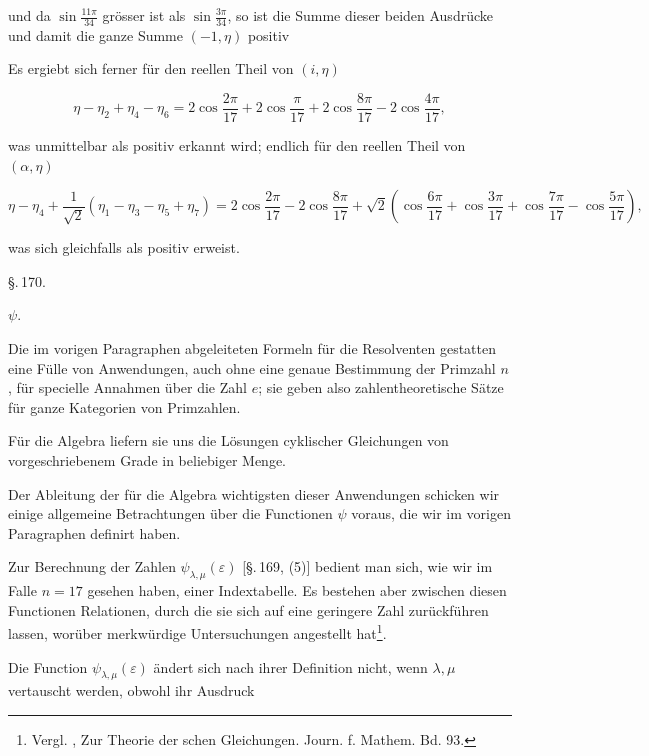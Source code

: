und da $\sin\frac{11\pi}{34}$ grösser ist als $\sin\frac{3\pi}{34}$, so ist die Summe dieser
beiden Ausdrücke und damit die ganze Summe $(-1,\eta)$ positiv %

Es ergiebt sich ferner für den reellen Theil von $(i,\eta)$

\[
\eta - \eta_2 + \eta_4 - \eta_6 = 2\cos\frac{2\pi}{17} + 2\cos\frac{\pi}{17} + 2\cos\frac{8\pi}{17} - 2\cos\frac{4\pi}{17},
\]

was unmittelbar als positiv erkannt wird; endlich für den reellen
Theil von $(\alpha,\eta)$

\[
\eta - \eta_4 + \frac{1}{\sqrt{2}}(\eta_1 - \eta_3 - \eta_5 + \eta_7)
= 2\cos\frac{2\pi}{17} - 2\cos\frac{8\pi}{17} + \sqrt{2}\left(\cos\frac{6\pi}{17} + \cos\frac{3\pi}{17} + \cos\frac{7\pi}{17} - \cos\frac{5\pi}{17}\right),
\]

was sich gleichfalls als positiv erweist.

\begin{center}
\S.\,170.

 $\psi$.
\end{center}

Die im vorigen Paragraphen abgeleiteten Formeln für die
Resolventen gestatten eine Fülle von Anwendungen, auch ohne
eine genaue Bestimmung der Primzahl $n$, für specielle Annahmen
über die Zahl $e$; sie geben also zahlentheoretische Sätze für
ganze Kategorien von Primzahlen.

Für die Algebra liefern sie uns die Lösungen cyklischer
Gleichungen von vorgeschriebenem Grade in beliebiger Menge.

Der Ableitung der für die Algebra wichtigsten dieser Anwendungen
schicken wir einige allgemeine Betrachtungen über
die Functionen $\psi$ voraus, die wir im vorigen Paragraphen definirt
haben.

Zur Berechnung der Zahlen $\psi_{\lambda,\mu}(\varepsilon)$ [\S.\,169, (5)] bedient man
sich, wie wir im Falle $n = 17$ gesehen haben, einer Indextabelle.
Es bestehen aber zwischen diesen Functionen Relationen, durch
die sie sich auf eine geringere Zahl zurückführen lassen, worüber
 merkwürdige Untersuchungen angestellt hat\footnote{Vergl. , Zur Theorie der schen Gleichungen. Journ. f. Mathem. Bd. 93.}.

Die Function $\psi_{\lambda,\mu}(\varepsilon)$ ändert sich nach ihrer Definition
nicht, wenn $\lambda,\mu$ vertauscht werden, obwohl ihr Ausdruck
